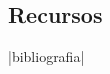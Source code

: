 \documentclass[landscape,10pt,oneside,oldfontcommands]{memoir} %
\begin{document}
\begin{comment}

\chapter{Criptograf\'{\i}a}\label{cript}
\monta|cap-8-cripto|

\chapter{M\'as teor\'{\i}a de n\'umeros}
\monta|cap-9-tnumeros2|

\chapter{Matem\'atica discreta}\label{discr}
\monta|cap-10-discreta|




\chapter{Probabilidad}\label{prob}
\monta|cap-11-probabilidad|


\chapter{Miscel\'anea}
\monta|cap-12-miscelanea|


\end{comment}


\begin{appendices}
\chapter{Recursos}
 \monta|bibliografia|
\end{appendices}
\end{document}
